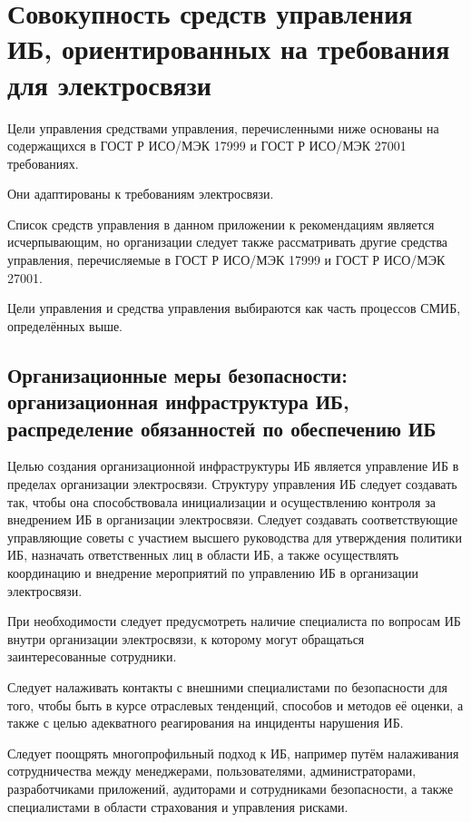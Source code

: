 \documentclass[12pt, russian, oneside, article]{ncc}
\begin{document}
\section{Совокупность средств управления ИБ, ориентированных на требования для электросвязи}
\label{sec-5}


Цели управления средствами управления, перечисленными ниже основаны на содержащихся в ГОСТ Р ИСО/МЭК 17999 и ГОСТ Р ИСО/МЭК 27001 требованиях.

Они адаптированы к требованиям электросвязи.

Список средств управления в данном приложении к рекомендациям является исчерпывающим, но организации следует также рассматривать другие средства управления, перечисляемые в ГОСТ Р ИСО/МЭК 17999 и ГОСТ Р ИСО/МЭК 27001.

Цели управления и средства управления выбираются как часть процессов СМИБ, определённых выше.
\subsection{Организационные меры безопасности: организационная инфраструктура ИБ, распределение обязанностей по обеспечению ИБ}
\label{sec-5_1}


Целью создания организационной инфраструктуры ИБ является управление ИБ в пределах организации электросвязи. Структуру управления ИБ следует создавать так, чтобы она способствовала инициализации и осуществлению контроля за внедрением ИБ в организации электросвязи. Следует создавать соответствующие управляющие советы с участием высшего руководства для утверждения политики ИБ, назначать ответственных лиц в области ИБ, а также осуществлять координацию и внедрение мероприятий по управлению ИБ в организации электросвязи.

При необходимости следует предусмотреть наличие специалиста по вопросам ИБ внутри организации электросвязи, к которому могут обращаться заинтересованные сотрудники.

Следует налаживать контакты с внешними специалистами по безопасности для того, чтобы быть в курсе отраслевых тенденций, способов и методов её оценки, а также с целью адекватного реагирования на инциденты нарушения ИБ.

Следует поощрять многопрофильный подход к ИБ, например путём налаживания сотрудничества между менеджерами, пользователями, администраторами, разработчиками приложений, аудиторами и сотрудниками безопасности, а также специалистами в области страхования и управления рисками.
\end{document}
